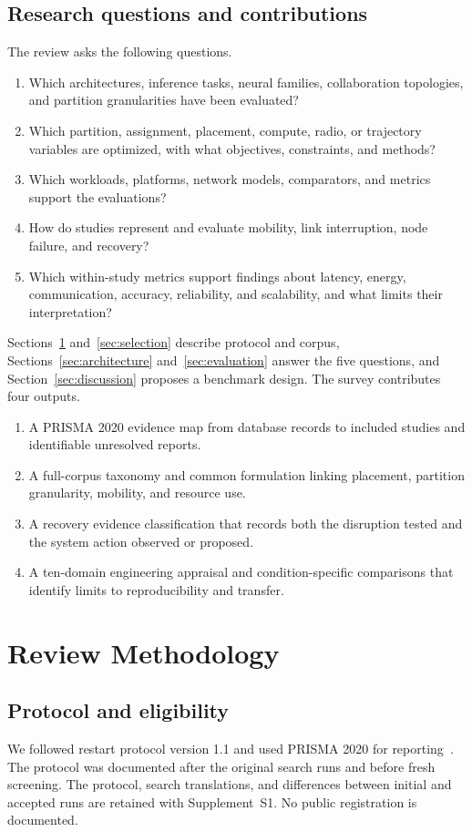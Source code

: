\documentclass[pdflatex,sn-vancouver-num]{sn-jnl}
\begin{document}
\subsection{Research questions and contributions}
The review asks the following questions.
\begin{enumerate}
\item[\textbf{RQ1}] Which architectures, inference tasks, neural families, collaboration topologies, and partition granularities have been evaluated?
\item[\textbf{RQ2}] Which partition, assignment, placement, compute, radio, or trajectory variables are optimized, with what objectives, constraints, and methods?
\item[\textbf{RQ3}] Which workloads, platforms, network models, comparators, and metrics support the evaluations?
\item[\textbf{RQ4}] How do studies represent and evaluate mobility, link interruption, node failure, and recovery?
\item[\textbf{RQ5}] Which within-study metrics support findings about latency, energy, communication, accuracy, reliability, and scalability, and what limits their interpretation?
\end{enumerate}
Sections~\ref{sec:methods} and~\ref{sec:selection} describe protocol and corpus, Sections~\ref{sec:architecture} and~\ref{sec:evaluation} answer the five questions, and Section~\ref{sec:discussion} proposes a benchmark design. The survey contributes four outputs.
\begin{enumerate}
\item A PRISMA 2020 evidence map from database records to included studies and identifiable unresolved reports.
\item A full-corpus taxonomy and common formulation linking placement, partition granularity, mobility, and resource use.
\item A recovery evidence classification that records both the disruption tested and the system action observed or proposed.
\item A ten-domain engineering appraisal and condition-specific comparisons that identify limits to reproducibility and transfer.
\end{enumerate}

\section{Review Methodology}\label{sec:methods}
\subsection{Protocol and eligibility}
We followed restart protocol version 1.1 and used PRISMA 2020 for reporting~\cite{prisma2020}. The protocol was documented after the original search runs and before fresh screening. The protocol, search translations, and differences between initial and accepted runs are retained with Supplement~S1. No public registration is documented.
\end{document}
